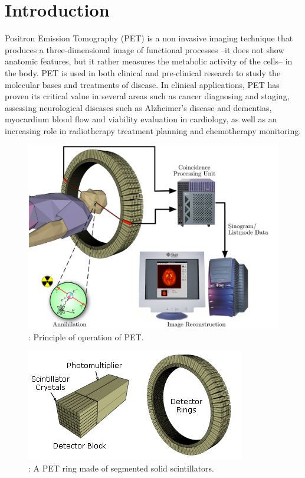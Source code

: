 \documentclass[review]{elsarticle}
\begin{document}
\section{Introduction}

Positron Emission Tomography (PET) is a non invasive imaging technique that produces a three-dimensional image of functional processes --it does not show anatomic features, but it rather  measures the metabolic activity of the cells-- in the body. PET is used in
both clinical and pre-clinical research to study the molecular bases and treatments of
disease. In clinical applications, PET has proven its critical value in several areas such as
cancer diagnosing and staging, assessing neurological diseases such as Alzheimer's disease
and dementias, myocardium blood flow and viability evaluation in cardiology, as well as an
increasing role in radiotherapy treatment planning and chemotherapy monitoring. 

\begin{figure}[!htb]
	\centering
	\includegraphics[scale=0.175]{../img/PET-schema.png}
	\caption{\label{fig.pet}: Principle of operation of PET. }
\end{figure}

\begin{figure}[!htb]
	\centering
	\includegraphics[scale=0.6]{../img/PET-detectorsystem_2.png}
	\caption{\label{fig.det}: A PET ring made of segmented solid scintillators. }
\end{figure}
\end{document}
